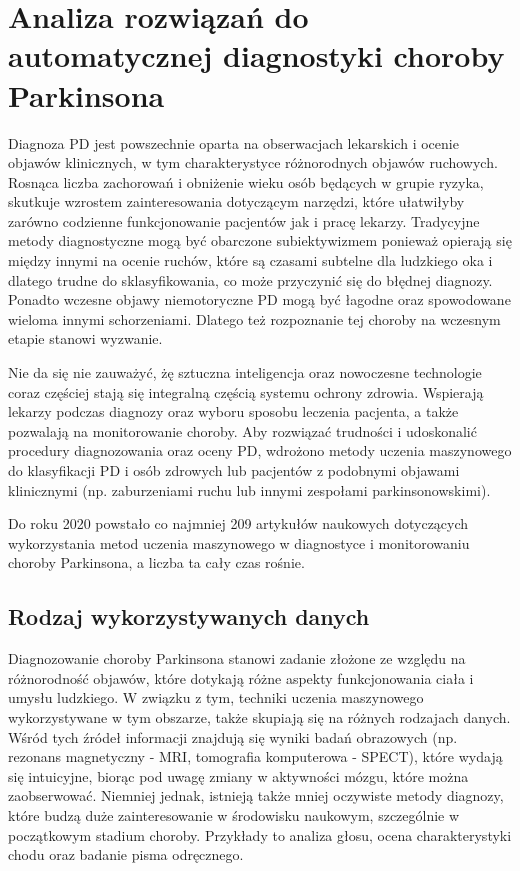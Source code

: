\chapter{Analiza rozwiązań do automatycznej diagnostyki choroby Parkinsona}\label{ch:analiza-rozwiazan}


Diagnoza PD jest powszechnie oparta na obserwacjach lekarskich i ocenie objawów klinicznych, w tym charakterystyce różnorodnych objawów ruchowych.
Rosnąca liczba zachorowań i obniżenie wieku osób będących w grupie ryzyka, skutkuje wzrostem zainteresowania dotyczącym narzędzi, które ułatwiłyby
zarówno codzienne funkcjonowanie pacjentów jak i pracę lekarzy.
Tradycyjne metody diagnostyczne mogą być obarczone subiektywizmem ponieważ opierają się między innymi na ocenie ruchów, które są czasami subtelne dla
ludzkiego oka i dlatego trudne do sklasyfikowania, co może przyczynić się do błędnej diagnozy.
Ponadto wczesne objawy niemotoryczne PD mogą być łagodne oraz spowodowane wieloma innymi schorzeniami.
Dlatego też rozpoznanie tej choroby na wczesnym etapie stanowi wyzwanie.

Nie da się nie zauważyć, żę sztuczna inteligencja oraz nowoczesne technologie coraz częściej stają się integralną częścią systemu ochrony zdrowia.
Wspierają lekarzy podczas diagnozy oraz wyboru sposobu leczenia pacjenta, a także pozwalają na monitorowanie choroby.
Aby rozwiązać trudności i udoskonalić procedury diagnozowania oraz oceny PD, wdrożono metody uczenia maszynowego do klasyfikacji PD i osób zdrowych lub
pacjentów z podobnymi objawami klinicznymi (np. zaburzeniami ruchu lub innymi zespołami parkinsonowskimi).


Do roku 2020 powstało co najmniej 209 artykułów naukowych dotyczących wykorzystania metod uczenia maszynowego w diagnostyce i monitorowaniu \cite{ML_for_PD_review}
choroby Parkinsona, a liczba ta cały czas rośnie.


\section{Rodzaj wykorzystywanych danych}\label{sec:dane-przeglad}

Diagnozowanie choroby Parkinsona stanowi zadanie złożone ze względu na różnorodność objawów, które dotykają różne aspekty
funkcjonowania ciała i umysłu ludzkiego.
W związku z tym, techniki uczenia maszynowego wykorzystywane w tym obszarze, także skupiają się na różnych rodzajach danych.
Wśród tych źródeł informacji znajdują się wyniki badań obrazowych (np. rezonans magnetyczny - MRI, tomografia komputerowa - SPECT),
które wydają się intuicyjne, biorąc pod uwagę zmiany w aktywności mózgu, które można zaobserwować.
Niemniej jednak, istnieją także mniej oczywiste metody diagnozy, które budzą duże zainteresowanie w środowisku naukowym, szczególnie w początkowym stadium choroby.
Przykłady to analiza głosu, ocena charakterystyki chodu oraz badanie pisma odręcznego.

